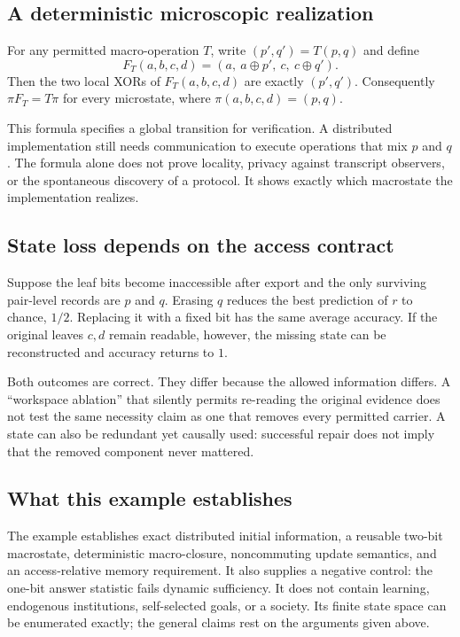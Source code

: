 \documentclass[11pt,letterpaper]{article}
\theoremstyle{plain}
\theoremstyle{definition}
\theoremstyle{remark}
\begin{document}
\subsection{A deterministic microscopic realization}
For any permitted macro-operation $T$, write $(p',q')=T(p,q)$ and define
\[
F_T(a,b,c,d)=(a,\ a\oplus p',\ c,\ c\oplus q').
\]
Then the two local XORs of $F_T(a,b,c,d)$ are exactly $(p',q')$. Consequently $\pi F_T=T\pi$ for every microstate, where $\pi(a,b,c,d)=(p,q)$.

This formula specifies a global transition for verification. A distributed implementation still needs communication to execute operations that mix $p$ and $q$. The formula alone does not prove locality, privacy against transcript observers, or the spontaneous discovery of a protocol. It shows exactly which macrostate the implementation realizes.

\subsection{State loss depends on the access contract}
Suppose the leaf bits become inaccessible after export and the only surviving pair-level records are $p$ and $q$. Erasing $q$ reduces the best prediction of $r$ to chance, $1/2$. Replacing it with a fixed bit has the same average accuracy. If the original leaves $c,d$ remain readable, however, the missing state can be reconstructed and accuracy returns to $1$.

Both outcomes are correct. They differ because the allowed information differs. A ``workspace ablation'' that silently permits re-reading the original evidence does not test the same necessity claim as one that removes every permitted carrier. A state can also be redundant yet causally used: successful repair does not imply that the removed component never mattered.

\subsection{What this example establishes}
The example establishes exact distributed initial information, a reusable two-bit macrostate, deterministic macro-closure, noncommuting update semantics, and an access-relative memory requirement. It also supplies a negative control: the one-bit answer statistic fails dynamic sufficiency. It does not contain learning, endogenous institutions, self-selected goals, or a society. Its finite state space can be enumerated exactly; the general claims rest on the arguments given above.
\end{document}
